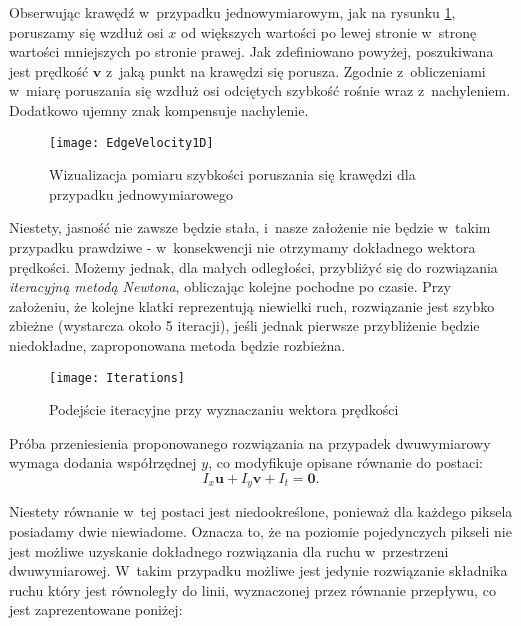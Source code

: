     \newpage
    Obserwując krawędź w~przypadku jednowymiarowym, jak na rysunku \ref{fig:EdgeVelocity1D}, poruszamy się wzdłuż osi $x$ od większych wartości po lewej stronie w~stronę wartości mniejszych po stronie prawej. Jak zdefiniowano powyżej, poszukiwana jest prędkość $\mathbf{v}$ z~jaką punkt na krawędzi się porusza. Zgodnie z~obliczeniami w~miarę poruszania się wzdłuż osi odciętych szybkość rośnie wraz z~nachyleniem. Dodatkowo ujemny znak kompensuje nachylenie.

    \begin{figure}[!ht]
      \centering
      \texttt{[image: EdgeVelocity1D]}
      \caption[Wizualizacja pomiaru szybkości poruszania się krawędzi dla przypadku jednowymiarowego]{Wizualizacja pomiaru szybkości poruszania się krawędzi dla przypadku jednowymiarowego}
      \label{fig:EdgeVelocity1D}
    \end{figure}

    Niestety, jasność nie zawsze będzie stała, i~nasze założenie nie będzie w~takim przypadku prawdziwe - w~konsekwencji nie otrzymamy dokładnego wektora prędkości. Możemy jednak, dla małych odległości, przybliżyć się do rozwiązania \textit{iteracyjną metodą Newtona}, obliczając kolejne pochodne po czasie. Przy założeniu, że kolejne klatki reprezentują niewielki ruch, rozwiązanie jest szybko zbieżne (wystarcza około 5 iteracji), jeśli jednak pierwsze przybliżenie będzie niedokładne, zaproponowana metoda będzie rozbieżna.

    \begin{figure}[!ht]
      \centering
      \texttt{[image: Iterations]}
      \caption[Podejście iteracyjne przy wyznaczaniu wektora prędkości]{Podejście iteracyjne przy wyznaczaniu wektora prędkości}
      \label{fig:Iterations}
    \end{figure}

    Próba przeniesienia proponowanego rozwiązania na przypadek dwuwymiarowy wymaga dodania współrzędnej $y$, co modyfikuje opisane równanie do postaci: \[I_{x}\mathbf{u} + I_{y}\mathbf{v} + I_{t} = \mathbf{0}. \]

    Niestety równanie w~tej postaci jest niedookreślone, ponieważ dla każdego piksela posiadamy dwie niewiadome. Oznacza to, że na poziomie pojedynczych pikseli nie jest możliwe uzyskanie dokładnego rozwiązania dla ruchu w~przestrzeni dwuwymiarowej. W~takim przypadku możliwe jest jedynie rozwiązanie składnika ruchu który jest równoległy do linii, wyznaczonej przez równanie przepływu, co jest zaprezentowane poniżej:


